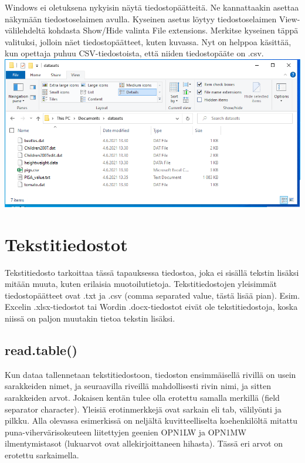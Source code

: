 \documentclass[
]{book}
\begin{document}
Windows ei oletuksena nykyisin näytä tiedostopäätteitä. Ne kannattaakin asettaa näkymään tiedostoselaimen avulla. Kyseinen asetus löytyy tiedostoselaimen View-välilehdeltä kohdasta Show/Hide valinta File extensions. Merkitse kyseinen täppä valituksi, jolloin näet tiedostopäätteet, kuten kuvassa. Nyt on helppoa käsittää, kun opettaja puhuu CSV-tiedostoista, että niiden tiedostopääte on .csv.
\includegraphics{files/03-reading_data/windows_show_file_extensions2.png}

\hypertarget{tekstitiedostot}{%
\section{Tekstitiedostot}\label{tekstitiedostot}}

Tekstitiedosto tarkoittaa tässä tapauksessa tiedostoa, joka ei sisällä tekstin lisäksi mitään muuta, kuten erilaisia muotoilutietoja. Tekstitiedostojen yleisimmät tiedostopäätteet ovat .txt ja .csv (comma separated value, tästä lisää pian). Esim. Excelin .xlsx-tiedostot tai Wordin .docx-tiedostot eivät ole tekstitiedostoja, koska niissä on paljon muutakin tietoa tekstin lisäksi.

\hypertarget{read.table}{%
\subsection{read.table()}\label{read.table}}

Kun dataa tallennetaan tekstitiedostoon, tiedoston ensimmäisellä rivillä on usein sarakkeiden nimet, ja seuraavilla riveillä mahdollisesti rivin nimi, ja sitten sarakkeiden arvot. Jokaisen kentän tulee olla erotettu samalla merkillä (field separator character). Yleisiä erotinmerkkejä ovat sarkain eli tab, välilyönti ja pilkku. Alla olevassa esimerkissä on neljältä kuvitteelliselta koehenkilöltä mitattu puna-vihervärisokeuteen liitettyjen geenien OPN1LW ja OPN1MW ilmentymistasot (lukuarvot ovat allekirjoittaneen hihasta). Tässä eri arvot on erotettu sarkaimella.
\end{document}
